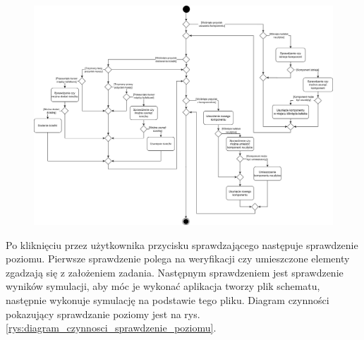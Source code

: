 \documentclass[12pt, a4paper]{article} %
\begin{document}
\begin{figure}[h]
	\centering
	\includegraphics[width=17cm]{images/diagramy_czynnosci/plan-diagram_czynnosci_realizacja_poziomu.png}
	\caption{}
	\label{rys:diagram_czynnosci_realizacja_poziomu}
\end{figure}

\aka Po kliknięciu przez użytkownika przycisku sprawdzającego następuje sprawdzenie poziomu. Pierwsze sprawdzenie polega na weryfikacji czy umieszczone elementy zgadzają się z założeniem zadania. Następnym sprawdzeniem jest sprawdzenie wyników symulacji, aby móc je wykonać aplikacja tworzy plik schematu, następnie wykonuje symulację na podstawie tego pliku. Diagram czynności pokazujący sprawdzanie poziomy jest na rys. \ref{rys:diagram_czynnosci_sprawdzenie_poziomu}.
\end{document}
